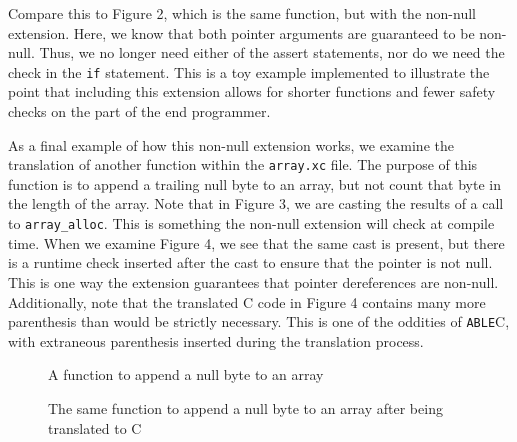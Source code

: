 \documentclass[main.tex]{subfiles}
\begin{document}
Compare this to Figure 2, which is the same function, but with the non-null extension. Here, we know that both pointer
arguments are guaranteed to be non-null. Thus, we no longer need either of the assert statements, nor do we need the check in
the \verb|if| statement. This is a toy example implemented to illustrate the point that including this extension allows for shorter 
functions and fewer safety checks on the part of the end programmer.

As a final example of how this non-null extension works, we examine the translation of another function within the \verb|array.xc|
file. The purpose of this function is to append a trailing null byte to an array, but not count that byte in the length of the array.
Note that in Figure 3, we are casting the results of a call to \verb|array_alloc|. This is something the non-null extension will check
at compile time. When we examine Figure 4, we see that the same cast is present, but there is a runtime check inserted after
the cast to ensure that the pointer is not null. This is one way the extension guarantees that pointer dereferences are non-null.
Additionally, note that the translated C code in Figure 4 contains many more parenthesis than would be strictly necessary.
This is one of the oddities of \verb|ABLE|C, with extraneous parenthesis inserted during the translation process.
\begin{figure}[p]

\caption{A function to append a null byte to an array}
\end{figure}
\begin{figure}[p]

\caption{The same function to append a null byte to an array after being translated to C}
\end{figure}
\end{document}
